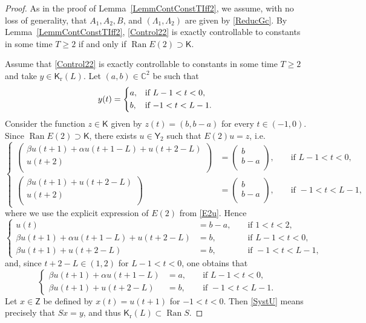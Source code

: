 \documentclass[10pt]{amsart}
\theoremstyle{plain}
\theoremstyle{definition}
\DeclareMathOperator{\range}{Ran}
\providecommand{\ie}{i.e.}\providecommand{\etc}{etc.}\providecommand{\resp}{resp.}\providecommand{\cf}{cf.}
\begin{document}
\begin{proof}
As in the proof of Lemma~\ref{LemmContConstTIff2}, we assume, with no loss of generality, that $A_1, A_2, B$, and $(\Lambda_1, \Lambda_2)$ are given by \eqref{ReducGc}. By Lemma~\ref{LemmContConstTIff2}, \eqref{Control22} is exactly controllable to constants in some time $T \geq 2$ if and only if $\range E(2) \supset \mathsf K$.

Assume that \eqref{Control22} is exactly controllable to constants in some time $T \geq 2$ and take $y \in \mathsf K_{\mathrm r}(L)$. Let $(a, b) \in \mathbb C^2$ be such that
\[
y(t) = \begin{dcases*}
a, & if $L - 1 < t < 0$, \\
b, & if $-1 < t < L - 1$.
\end{dcases*}
\]
Consider the function $z \in \mathsf K$ given by $z(t) = (b, b - a)$ for every $t \in (-1, 0)$. Since $\range E(2) \supset \mathsf K$, there exists $u \in \mathsf Y_2$ such that $E(2) u = z$, \ie 
\[
\left\{
\begin{aligned}
\begin{pmatrix}
\beta u(t + 1) + \alpha u(t + 1 - L) + u(t + 2 - L) \\
u(t + 2) \\
\end{pmatrix} & = \begin{pmatrix}
b \\
b - a \\
\end{pmatrix}, & & \text{ if } L - 1 < t < 0, \\
\begin{pmatrix}
\beta u(t + 1) + u(t + 2 - L) \\
u(t + 2) \\
\end{pmatrix} & = \begin{pmatrix}
b \\
b - a \\
\end{pmatrix}, & & \text{ if } -1 < t < L - 1,
\end{aligned}
\right.
\]
where we use the explicit expression of $E(2)$ from \eqref{E2u}. Hence
\[
\left\{
\begin{aligned}
u(t) & = b - a, & & \text{ if } 1 < t < 2, \\
\beta u(t + 1) + \alpha u(t + 1 - L) + u(t + 2 - L) & = b, & & \text{ if } L - 1 < t < 0, \\
\beta u(t + 1) + u(t + 2 - L) & = b, & & \text{ if } -1 < t < L - 1,
\end{aligned}
\right.
\]
and, since $t + 2 - L \in (1, 2)$ for $L - 1 < t < 0$, one obtains that
\begin{equation}
\label{SystU}
\left\{
\begin{aligned}
\beta u(t + 1) + \alpha u(t + 1 - L) & = a, & & \text{ if } L - 1 < t < 0, \\
\beta u(t + 1) + u(t + 2 - L) & = b, & & \text{ if } -1 < t < L - 1.
\end{aligned}
\right.
\end{equation}
Let $x \in \mathsf Z$ be defined by $x(t) = u(t + 1)$ for $-1 < t < 0$. Then \eqref{SystU} means precisely that $S x = y$, and thus $\mathsf K_{\mathrm r}(L) \subset \range S$.


\end{proof}
\end{document}

